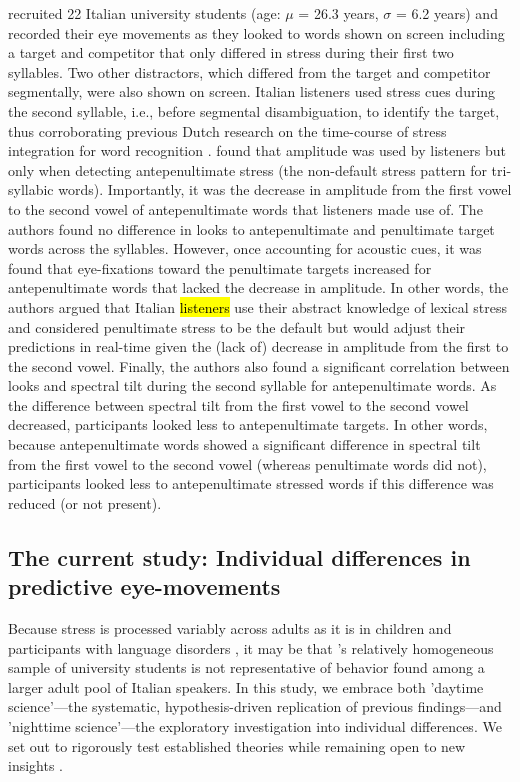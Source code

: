 {\cite{Sulpizio_McQueen_2012} recruited 22 Italian university students (age: $\mu$ = 26.3 years, $\sigma$ = 6.2 years) and recorded their eye movements as they looked to words shown on screen including a target and competitor that only differed in stress during their first two syllables. Two other distractors, which differed from the target and competitor segmentally, were also shown on screen. Italian listeners used stress cues during the second syllable, i.e., before segmental disambiguation, to identify the target, thus corroborating previous Dutch research on the time-course of stress integration for word recognition \citep{Reinisch2010}. \cite{Sulpizio_McQueen_2012} found that amplitude was used by listeners but only when detecting antepenultimate stress (the non-default stress pattern for tri-syllabic words). Importantly, it was the decrease in amplitude from the first vowel to the second vowel of antepenultimate words that listeners made use of. The authors found no difference in looks to antepenultimate and penultimate target words across the syllables. However, once accounting for acoustic cues, it was found that eye-fixations toward the penultimate targets increased for antepenultimate words that lacked the decrease in amplitude. In other words, the authors argued that Italian \hl{listeners} use their abstract knowledge of lexical stress and considered penultimate stress to be the default but would adjust their predictions in real-time given the (lack of) decrease in amplitude from the first to the second vowel. Finally, the authors also found a significant correlation between looks and spectral tilt during the second syllable for antepenultimate words. As the difference between spectral tilt from the first vowel to the second vowel decreased, participants looked less to antepenultimate targets. In other words, because antepenultimate words showed a significant difference in spectral tilt from the first vowel to the second vowel (whereas penultimate words did not), participants looked less to antepenultimate stressed words if this difference was reduced (or not present). 



\subsection{The current study: Individual differences in predictive eye-movements}
Because stress is processed variably across adults as it is in children \citep[e.g.,][]{Colombo2014} and participants with language disorders \citep[e.g.,][]{Cappa1997, Liu2018}, it may be that \cite{Sulpizio_McQueen_2012}'s relatively homogeneous sample of university students is not representative of behavior found among a larger adult pool of Italian speakers. In this study, we embrace both 'daytime science'—the systematic, hypothesis-driven replication of previous findings—and 'nighttime science'—the exploratory investigation into individual differences. We set out to rigorously test established theories while remaining open to new insights \citep{Yanai2020}.

}
